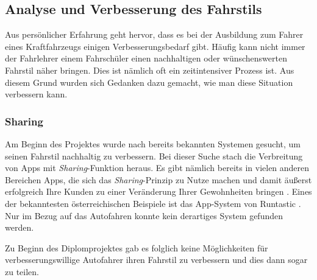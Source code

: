 \subsection{Analyse und Verbesserung des Fahrstils}

Aus persönlicher Erfahrung geht hervor, dass es bei der Ausbildung zum Fahrer eines Kraftfahrzeugs einigen Verbesserungsbedarf gibt. Häufig kann nicht immer der Fahrlehrer einem Fahrschüler einen nachhaltigen oder wünschenswerten Fahrstil näher bringen. Dies ist nämlich oft ein zeitintensiver Prozess ist. Aus diesem Grund wurden sich Gedanken dazu gemacht, wie man diese Situation verbessern kann.

\subsubsection{Sharing}
Am Beginn des Projektes wurde nach bereits bekannten Systemen gesucht, um seinen Fahrstil nachhaltig zu verbessern. Bei dieser Suche stach die Verbreitung von Apps mit \textit{Sharing}-Funktion heraus. Es gibt nämlich bereits in vielen anderen Bereichen Apps, die sich das \textit{Sharing}-Prinzip zu Nutze machen und damit äußerst erfolgreich Ihre Kunden zu einer Veränderung Ihrer Gewohnheiten bringen \cite{SIMR.CH1-fahrstil-analyse.GewohnheitenLoslassen}. Eines der bekanntesten österreichischen Beispiele ist das App-System von Runtastic \cite{SIMR.CH1-Fahrstil-Analyse.BusinessplanRuntastic}.
Nur im Bezug auf das Autofahren konnte kein derartiges System  gefunden werden.

Zu Beginn des Diplomprojektes gab es folglich keine Möglichkeiten für verbesserungswillige Autofahrer ihren Fahrstil zu verbessern und dies dann sogar zu teilen. 
\newpage

